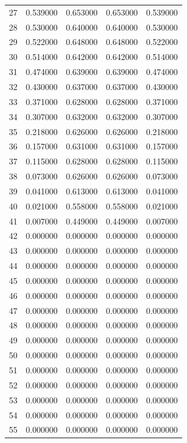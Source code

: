 \begin{tabular}{lrrrr}
27 & 0.539000 & 0.653000 & 0.653000 & 0.539000 \\
28 & 0.530000 & 0.640000 & 0.640000 & 0.530000 \\
29 & 0.522000 & 0.648000 & 0.648000 & 0.522000 \\
30 & 0.514000 & 0.642000 & 0.642000 & 0.514000 \\
31 & 0.474000 & 0.639000 & 0.639000 & 0.474000 \\
32 & 0.430000 & 0.637000 & 0.637000 & 0.430000 \\
33 & 0.371000 & 0.628000 & 0.628000 & 0.371000 \\
34 & 0.307000 & 0.632000 & 0.632000 & 0.307000 \\
35 & 0.218000 & 0.626000 & 0.626000 & 0.218000 \\
36 & 0.157000 & 0.631000 & 0.631000 & 0.157000 \\
37 & 0.115000 & 0.628000 & 0.628000 & 0.115000 \\
38 & 0.073000 & 0.626000 & 0.626000 & 0.073000 \\
39 & 0.041000 & 0.613000 & 0.613000 & 0.041000 \\
40 & 0.021000 & 0.558000 & 0.558000 & 0.021000 \\
41 & 0.007000 & 0.449000 & 0.449000 & 0.007000 \\
42 & 0.000000 & 0.000000 & 0.000000 & 0.000000 \\
43 & 0.000000 & 0.000000 & 0.000000 & 0.000000 \\
44 & 0.000000 & 0.000000 & 0.000000 & 0.000000 \\
45 & 0.000000 & 0.000000 & 0.000000 & 0.000000 \\
46 & 0.000000 & 0.000000 & 0.000000 & 0.000000 \\
47 & 0.000000 & 0.000000 & 0.000000 & 0.000000 \\
48 & 0.000000 & 0.000000 & 0.000000 & 0.000000 \\
49 & 0.000000 & 0.000000 & 0.000000 & 0.000000 \\
50 & 0.000000 & 0.000000 & 0.000000 & 0.000000 \\
51 & 0.000000 & 0.000000 & 0.000000 & 0.000000 \\
52 & 0.000000 & 0.000000 & 0.000000 & 0.000000 \\
53 & 0.000000 & 0.000000 & 0.000000 & 0.000000 \\
54 & 0.000000 & 0.000000 & 0.000000 & 0.000000 \\
55 & 0.000000 & 0.000000 & 0.000000 & 0.000000 \\

\end{tabular}

